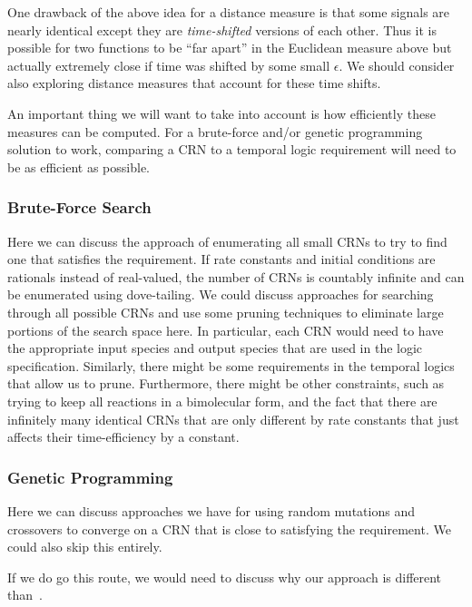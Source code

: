 One drawback of the above idea for a distance measure is that some signals are nearly identical except they are \emph{time-shifted} versions of each other.
Thus it is possible for two functions to be ``far apart'' in the Euclidean measure above but actually extremely close if time was shifted by some small \( \epsilon \).
We should consider also exploring distance measures that account for these time shifts.

An important thing we will want to take into account is how efficiently these measures can be computed.
For a brute-force and/or genetic programming solution to work, comparing a CRN to a temporal logic requirement will need to be as efficient as possible.

\subsubsection{Brute-Force Search}
Here we can discuss the approach of enumerating all small CRNs to try to find one that satisfies the requirement.
If rate constants and initial conditions are rationals instead of real-valued, the number of CRNs is countably infinite and can be enumerated using dove-tailing.
We could discuss approaches for searching through all possible CRNs and use some pruning techniques to eliminate large portions of the search space here.
In particular, each CRN would need to have the appropriate input species and output species that are used in the logic specification.
Similarly, there might be some requirements in the temporal logics that allow us to prune.
Furthermore, there might be other constraints, such as trying to keep all reactions in a bimolecular form, and the fact that there are infinitely many identical CRNs that are only different by rate constants that just affects their time-efficiency by a constant.

\subsubsection{Genetic Programming}
Here we can discuss approaches we have for using random mutations and crossovers to converge on a CRN that is close to satisfying the requirement.
We could also skip this entirely.

If we do go this route, we would need to discuss why our approach is different than~\cite{Koza2007,hii2014utilizing,Tsuchiya2001,cardelli2017,phillips2018}.
